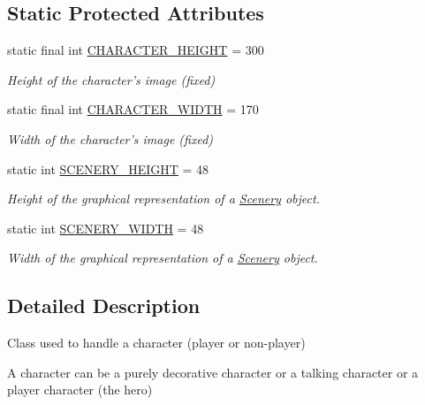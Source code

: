 \subsection*{Static Protected Attributes}
\begin{DoxyCompactItemize}
\item 
static final int \hyperlink{classworld_1_1character_1_1_character_a31596c03022d61aeb8aac56f149309be}{C\-H\-A\-R\-A\-C\-T\-E\-R\-\_\-\-H\-E\-I\-G\-H\-T} = 300
\begin{DoxyCompactList}\small\item\em Height of the character's image (fixed) \end{DoxyCompactList}\item 
static final int \hyperlink{classworld_1_1character_1_1_character_a2a46ba03b3e10896b7757f891336e8b8}{C\-H\-A\-R\-A\-C\-T\-E\-R\-\_\-\-W\-I\-D\-T\-H} = 170
\begin{DoxyCompactList}\small\item\em Width of the character's image (fixed) \end{DoxyCompactList}\item 
static int \hyperlink{classworld_1_1scenery_1_1_scenery_a106e53ae6e1647395740237ccce7f363}{S\-C\-E\-N\-E\-R\-Y\-\_\-\-H\-E\-I\-G\-H\-T} = 48
\begin{DoxyCompactList}\small\item\em Height of the graphical representation of a \hyperlink{classworld_1_1scenery_1_1_scenery}{Scenery} object. \end{DoxyCompactList}\item 
static int \hyperlink{classworld_1_1scenery_1_1_scenery_affb047c028883c6d069a03ef0f1caeb8}{S\-C\-E\-N\-E\-R\-Y\-\_\-\-W\-I\-D\-T\-H} = 48
\begin{DoxyCompactList}\small\item\em Width of the graphical representation of a \hyperlink{classworld_1_1scenery_1_1_scenery}{Scenery} object. \end{DoxyCompactList}\end{DoxyCompactItemize}


\subsection{Detailed Description}
Class used to handle a character (player or non-\/player) 

A character can be a purely decorative character or a talking character or a player character (the hero) 

